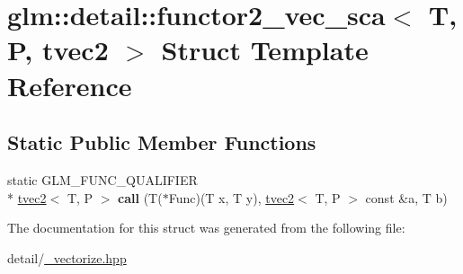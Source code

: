 \hypertarget{structglm_1_1detail_1_1functor2__vec__sca_3_01T_00_01P_00_01tvec2_01_4}{\section{glm\-:\-:detail\-:\-:functor2\-\_\-vec\-\_\-sca$<$ T, P, tvec2 $>$ Struct Template Reference}
\label{structglm_1_1detail_1_1functor2__vec__sca_3_01T_00_01P_00_01tvec2_01_4}
}
\subsection*{Static Public Member Functions}
\begin{DoxyCompactItemize}
\item 
\hypertarget{structglm_1_1detail_1_1functor2__vec__sca_3_01T_00_01P_00_01tvec2_01_4_ad640cc49fdd9c6451bff02195a618c55}{static G\-L\-M\-\_\-\-F\-U\-N\-C\-\_\-\-Q\-U\-A\-L\-I\-F\-I\-E\-R \\*
\hyperlink{structglm_1_1tvec2}{tvec2}$<$ T, P $>$ {\bfseries call} (T($\ast$Func)(T x, T y), \hyperlink{structglm_1_1tvec2}{tvec2}$<$ T, P $>$ const \&a, T b)}\label{structglm_1_1detail_1_1functor2__vec__sca_3_01T_00_01P_00_01tvec2_01_4_ad640cc49fdd9c6451bff02195a618c55}

\end{DoxyCompactItemize}


The documentation for this struct was generated from the following file\-:\begin{DoxyCompactItemize}
\item 
detail/\hyperlink{__vectorize_8hpp}{\-\_\-vectorize.\-hpp}\end{DoxyCompactItemize}
